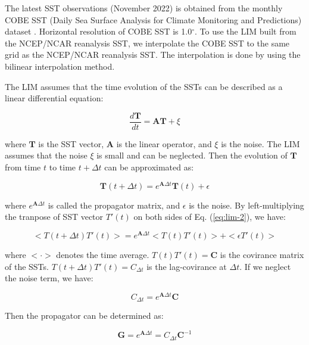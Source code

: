 \documentclass[12pt,a4paper]{article}
\begin{document}
The latest SST observations (November 2022) is obtained from the monthly COBE SST (Daily Sea Surface Analysis for Climate Monitoring and Predictions) dataset \cite{Ishii2005}. Horizontal resolution of COBE SST is 1.0$^{\circ}$. To use the LIM built from the NCEP/NCAR reanalysis SST, we interpolate the COBE SST to the same grid as the NCEP/NCAR reanalysis SST. The interpolation is done by using the bilinear interpolation method.

The LIM assumes that the time evolution of the SSTs can be described as a linear differential equation:

\begin{equation}
\label{eq:lim}
\frac{d\mathbf{T}}{dt} = \mathbf{A} \mathbf{T} + \xi
\end{equation}

where $\mathbf{T}$ is the SST vector, $\mathbf{A}$ is the linear operator, and $\xi$ is the noise. The LIM assumes that the noise $\xi$ is small and can be neglected. Then the evolution of $\mathbf{T}$ from time $t$ to time $t+\Delta t$ can be approximated as:

\begin{equation}
\label{eq:lim-2}
\mathbf{T}(t+\Delta t) = e^{\mathbf{A}\Delta t} \mathbf{T}(t) + \epsilon
\end{equation}

where $e^{\mathbf{A}\Delta t}$ is called the propagator matrix, and $\epsilon$ is the noise. By left-multiplying the tranpose of SST vector $T' (t)$ on both sides of Eq. (\ref{eq:lim-2}), we have:

\begin{equation}
\label{eq:lim-3}
<T(t+\Delta t) T'(t)> = e^{\mathbf{A}\Delta t} <T(t) T'(t)> + <\epsilon T'(t)>
\end{equation}

where $<\cdot>$ denotes the time average. $T(t)T'(t) = \mathbf{C}$ is the covirance matrix of the SSTs. $T(t+\Delta t)T'(t) = C_{\Delta t}$ is the lag-covirance at $\Delta t$. If we neglect the noise term, we have:

\begin{equation}
\label{eq:lim-4}
C_{\Delta t} = e^{\mathbf{A}\Delta t} \mathbf{C}
\end{equation}

Then the propagator can be determined as:

\begin{equation}
\label{eq:lim-5}
\mathbf{G}=e^{\mathbf{A}\Delta t} = C_{\Delta t} \mathbf{C}^{-1}
\end{equation}
\end{document}
